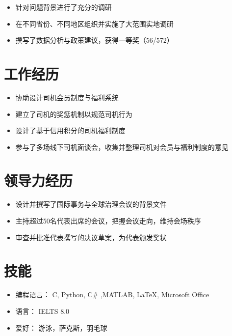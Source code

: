 \documentclass{resume}
\begin{document}
\begin{itemize}
  \item 针对问题背景进行了充分的调研
  \item 在不同省份、不同地区组织并实施了大范围实地调研
  \item 撰写了数据分析与政策建议，获得一等奖（56/572）
\end{itemize}

\section{工作经历}
\begin{itemize}
  \item 协助设计司机会员制度与福利系统
  \item 建立了司机的奖惩机制以规范司机行为
  \item 设计了基于信用积分的司机福利制度
  \item 参与了多场线下司机面谈会，收集并整理司机对会员与福利制度的意见
\end{itemize}


\section{领导力经历}


\begin{itemize}
  \item 设计并撰写了国际事务与全球治理会议的背景文件
  \item 主持超过50名代表出席的会议，把握会议走向，维持会场秩序
  \item 审查并批准代表撰写的决议草案，为代表颁发奖状
\end{itemize}

\section{技能}
\begin{itemize}[parsep=0.5ex]
  \item 编程语言： C, Python, C\# ,MATLAB, \LaTeX, Microsoft Office
  \item 语言： IELTS 8.0
  \item 爱好： 游泳，萨克斯，羽毛球 %
\end{itemize}
\end{document}
